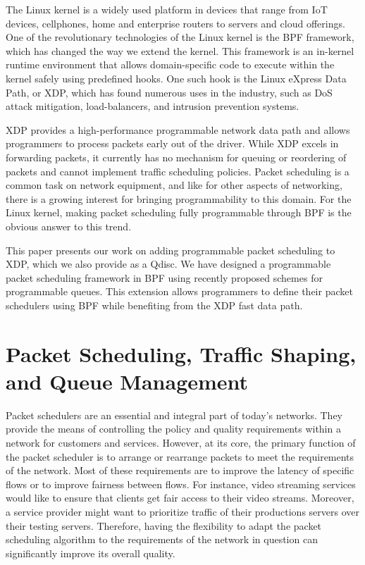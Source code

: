 \documentclass[sigconf, nonacm]{acmart}
\begin{document}
The Linux kernel is a widely used platform in devices that range from IoT devices, cellphones, home and enterprise routers to servers and cloud offerings. One of the revolutionary technologies of the Linux kernel is the BPF framework, which has changed the way we extend the kernel. This framework is an in-kernel runtime environment that allows domain-specific code to execute within the kernel safely using predefined hooks. One such hook is the Linux eXpress Data Path\cite{hoiland2018express}, or XDP, which has found numerous uses in the industry, such as DoS attack mitigation, load-balancers, and intrusion prevention systems.

XDP provides a high-performance programmable network data path and allows programmers to process packets early out of the driver. While XDP excels in forwarding packets, it currently has no mechanism for queuing or reordering of packets and cannot implement traffic scheduling policies. Packet scheduling is a common task on network equipment, and like for other aspects of networking, there is a growing interest for bringing programmability to this domain. For the Linux kernel, making packet scheduling fully programmable through BPF is the obvious answer to this trend.

This paper presents our work on adding programmable packet scheduling to XDP, which we also provide as a Qdisc. We have designed a programmable packet scheduling framework in BPF using recently proposed schemes for programmable queues. This extension allows programmers to define their packet schedulers using BPF while benefiting from the XDP fast data path.


\section{Packet Scheduling, Traffic Shaping, and Queue Management}

Packet schedulers are an essential and integral part of today's networks. They provide the means of controlling the policy and quality requirements within a network for customers and services. However, at its core, the primary function of the packet scheduler is to arrange or rearrange packets to meet the requirements of the network. Most of these requirements are to improve the latency of specific flows or to improve fairness between flows. For instance, video streaming services would like to ensure that clients get fair access to their video streams. Moreover, a service provider might want to prioritize traffic of their productions servers over their testing servers. Therefore, having the flexibility to adapt the packet scheduling algorithm to the requirements of the network in question can significantly improve its overall quality.
\end{document}
